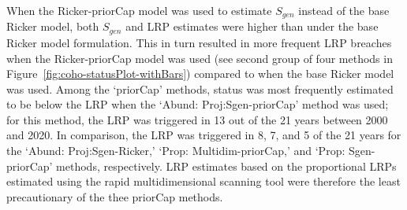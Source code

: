 \documentclass[11pt]{book}
\begin{document}
When the Ricker-priorCap model was used to estimate \(S_{gen}\) instead of the base Ricker model, both \(S_{gen}\) and LRP estimates were higher than under the base Ricker model formulation. This in turn resulted in more frequent LRP breaches when the Ricker-priorCap model was used (see second group of four methods in Figure~\ref{fig:coho-statusPlot-withBars}) compared to when the base Ricker model was used. Among the `priorCap' methods, status was most frequently estimated to be below the LRP when the `Abund: Proj:Sgen-priorCap' method was used; for this method, the LRP was triggered in 13 out of the 21 years between 2000 and 2020. In comparison, the LRP was triggered in 8, 7, and 5 of the 21 years for the `Abund: Proj:Sgen-Ricker,' `Prop: Multidim-priorCap,' and `Prop: Sgen-priorCap' methods, respectively. LRP estimates based on the proportional LRPs estimated using the rapid multidimensional scanning tool were therefore the least precautionary of the thee priorCap methods.
\end{document}
